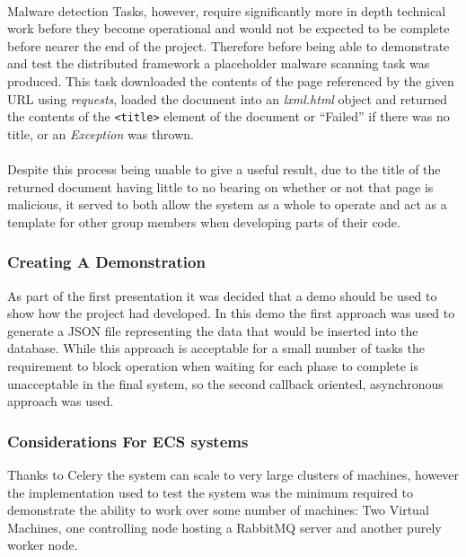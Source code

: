 \paragraph{}
Malware detection Tasks, however, require significantly more in depth technical work before they become operational and would not be expected to be complete before nearer the end of the project. Therefore before being able to demonstrate and test the distributed framework a placeholder malware scanning task was produced. This task downloaded the contents of the page referenced by the given URL using \emph{requests}, loaded the document into an \emph{lxml.html} object and returned the contents of the \verb`<title>` element of the document or ``Failed'' if there was no title, or an \emph{Exception} was thrown.

\paragraph{}
Despite this process being unable to give a useful result, due to the title of the returned document having little to no bearing on whether or not that page is malicious, it served to both allow the system as a whole to operate and act as a template for other group members when developing parts of their code.

\subsubsection{Creating A Demonstration}
As part of the first presentation it was decided that a demo should be used to show how the project had developed.  In this demo the first approach was used to generate a JSON file representing the data that would be inserted into the database.  While this approach is acceptable for a small number of tasks the requirement to block operation when waiting for each phase to complete is unacceptable in the final system, so the second callback oriented, asynchronous approach was used.

\subsubsection{Considerations For ECS systems}
Thanks to Celery the system can scale to very large clusters of machines, however the implementation used to test the system was the minimum required to demonstrate the ability to work over some number of machines: Two Virtual Machines, one controlling node hosting a RabbitMQ server and another purely worker node.